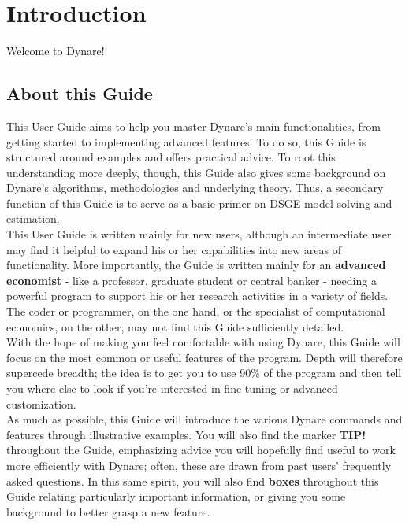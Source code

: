 \chapter{Introduction} \label{ch:intro}

Welcome to Dynare! \\

\section{About this Guide}
This User Guide aims to help you master Dynare's main functionalities, from getting started to implementing advanced features. To do so, this Guide is structured around examples and offers practical advice. To root this understanding more deeply, though, this Guide also gives some background on Dynare's algorithms, methodologies and underlying theory. Thus, a secondary function of this Guide is to serve as a basic primer on DSGE model solving and estimation. \\

This User Guide is written mainly for new users, although an intermediate user may find it helpful to expand his or her capabilities into new areas of functionality. More importantly, the Guide is written mainly for an \textbf{advanced economist} - like a professor, graduate student or central banker - needing a powerful program to support his or her research activities in a variety of fields. The coder or programmer, on the one hand, or the specialist of computational economics, on the other, may not find this Guide sufficiently detailed. \\

With the hope of making you feel comfortable with using Dynare, this Guide will focus on the most common or useful features of the program. Depth will therefore supercede breadth; the idea is to get you to use 90\% of the program and then tell you where else to look if you're interested in fine tuning or advanced customization.\\

As much as possible, this Guide will introduce the various Dynare commands and features through illustrative examples. You will also find the marker \textbf{\textsf{TIP!}} throughout the Guide, emphasizing advice you will hopefully find useful to work more efficiently with Dynare; often, these are drawn from past users' frequently asked questions. In this same spirit, you will also find \textbf{boxes} throughout this Guide relating particularly important information, or giving you some background to better grasp a new feature.\\

